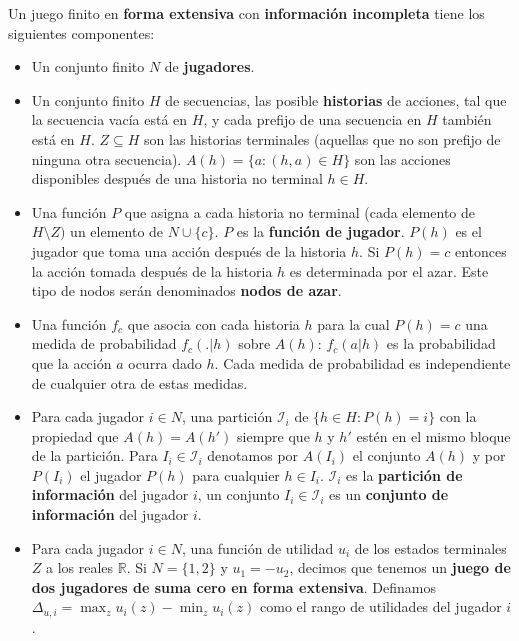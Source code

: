 \begin{definition}
\label{def:informacion-incompleta}
Un juego finito en \textbf{forma extensiva} con \textbf{información incompleta} tiene los siguientes componentes:
\begin{itemize}[noitemsep]
  \item Un conjunto finito $N$ de \textbf{jugadores}.
  \item Un conjunto finito $H$ de secuencias, las posible \textbf{historias} de acciones, tal que la secuencia vacía está en $H$, y cada prefijo de una secuencia en $H$ también está en $H$. $Z \subseteq H$ son las historias terminales (aquellas que no son prefijo de ninguna otra secuencia). $A(h) = \{ a : (h, a) \in H \}$ son las acciones disponibles después de una historia no terminal $h \in H$.
  \item Una función $P$ que asigna a cada historia no terminal (cada elemento de $H \setminus Z)$ un elemento de $N \cup \{c \}$. $P$ es la \textbf{función de jugador}. $P(h)$ es el jugador que toma una acción después de la historia $h$. Si $P(h) = c$ entonces la acción tomada después de la historia $h$ es determinada por el azar. Este tipo de nodos serán denominados \textbf{nodos de azar}.
  \item Una función $f_c$ que asocia con cada historia $h$ para la cual $P(h) = c$ una medida de probabilidad $f_c(.|h)$ sobre $A(h)$: $f_c(a|h)$ es la probabilidad que la acción $a$ ocurra dado $h$.  Cada medida de probabilidad es independiente de cualquier otra de estas medidas.
  \item Para cada jugador $i \in N$, una partición $\mathcal{I}_i$ de $\{h \in H : P(h) = i\}$ con la propiedad que $A(h) = A(h')$ siempre que $h$ y $h'$ estén en el mismo bloque de la partición. Para $I_i \in \mathcal{I}_i$ denotamos por $A(I_i)$ el conjunto $A(h)$ y por $P(I_i)$ el jugador $P(h)$ para cualquier $h \in I_i$. $\mathcal{I}_i$ es la \textbf{partición de información} del jugador $i$, un conjunto $I_i \in \mathcal{I}_i$ es un \textbf{conjunto de información} del jugador $i$.
  \item Para cada jugador $i \in N$, una función de utilidad $u_i$ de los estados terminales $Z$ a los reales $\mathbb{R}$. Si $N = \{1,2\}$ y $u_1 = -u_2$, decimos que tenemos un \textbf{juego de dos jugadores de suma cero en forma extensiva}. Definamos $\Delta_{u,i} = \max_z u_i(z) - \min_z u_i(z)$ como el rango de utilidades del jugador $i$.
\end{itemize}
\end{definition}

